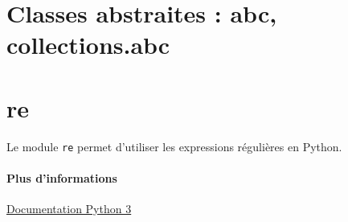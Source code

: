 \documentclass[a4paper, 10pt]{article}
\begin{document}
\section{Classes abstraites : abc, collections.abc}\label{abc}

\section{re}
Le module \texttt{re} permet d'utiliser les expressions régulières en Python.
\paragraph{Plus d'informations} \href{https://docs.python.org/fr/3/library/re.html}{Documentation Python 3}
\end{document}
